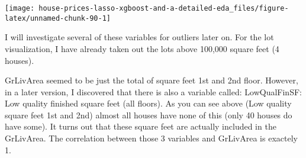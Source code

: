 \documentclass[]{article}
\newenvironment{Shaded}{\begin{snugshade}}{\end{snugshade}}
\newcommand{\KeywordTok}[1]{\textcolor[rgb]{0.13,0.29,0.53}{\textbf{#1}}}
\newcommand{\DataTypeTok}[1]{\textcolor[rgb]{0.13,0.29,0.53}{#1}}
\newcommand{\DecValTok}[1]{\textcolor[rgb]{0.00,0.00,0.81}{#1}}
\newcommand{\StringTok}[1]{\textcolor[rgb]{0.31,0.60,0.02}{#1}}
\newcommand{\OtherTok}[1]{\textcolor[rgb]{0.56,0.35,0.01}{#1}}
\newcommand{\OperatorTok}[1]{\textcolor[rgb]{0.81,0.36,0.00}{\textbf{#1}}}
\newcommand{\NormalTok}[1]{#1}
\begin{document}
\begin{Shaded}
\end{Shaded}

\texttt{[image: house-prices-lasso-xgboost-and-a-detailed-eda\_files/figure-latex/unnamed-chunk-90-1]}

I will investigate several of these variables for outliers later on. For
the lot visualization, I have already taken out the lots above 100,000
square feet (4 houses).

GrLivArea seemed to be just the total of square feet 1st and 2nd floor.
However, in a later version, I discovered that there is also a variable
called: LowQualFinSF: Low quality finished square feet (all floors). As
you can see above (Low quality square feet 1st and 2nd) almost all
houses have none of this (only 40 houses do have some). It turns out
that these square feet are actually included in the GrLivArea. The
correlation between those 3 variables and GrLivArea is exactely 1.
\end{document}
